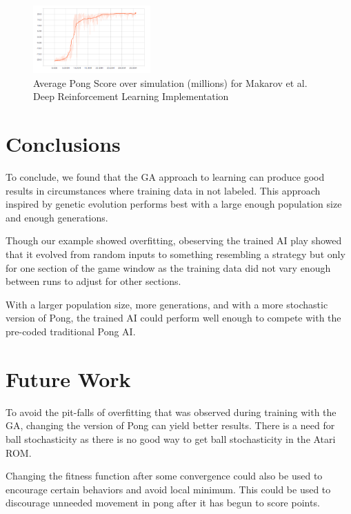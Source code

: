 \documentclass[conference]{IEEEtran}
\begin{document}
\begin{figure}[htbp]
\centerline{\includegraphics[width=0.4\textwidth]{rl__graph.png}}
\caption{Average Pong Score over simulation (millions) for Makarov et al. Deep Reinforcement Learning Implementation}
\label{overfitting}
\end{figure}



\section{Conclusions}

To conclude, we found that the GA approach to learning can produce good results in circumstances where training data in not labeled. This approach inspired by genetic evolution performs best with a large enough population size and enough generations.

Though our example showed overfitting, obeserving the trained AI play showed that it evolved from random inputs to something resembling a strategy but only for one section of the game window as the training data did not vary enough between runs to adjust for other sections.

With a larger population size, more generations, and with a more stochastic version of Pong, the trained AI could perform well enough to compete with the pre-coded traditional Pong AI.

\section{Future Work}

To avoid the pit-falls of overfitting that was observed during training with the GA, changing the version of Pong can yield better results. There is a need for ball stochasticity as there is no good way to get ball stochasticity in the Atari ROM.

Changing the fitness function after some convergence could also be used to encourage certain behaviors and avoid local minimum. This could be used to discourage unneeded movement in pong after it has begun to score points.

{}


\vspace{12pt}
\end{document}
